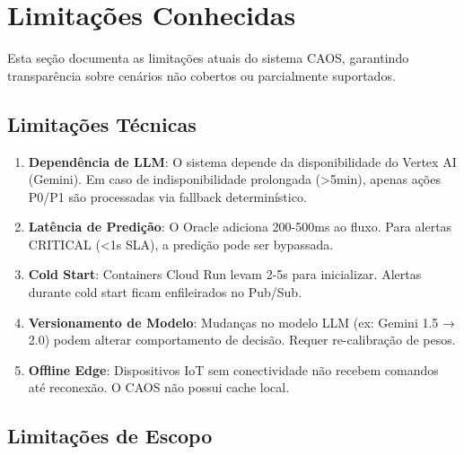 \documentclass[12pt, a4paper]{article}
\begin{document}
\newpage

\section{Limitações Conhecidas}
\label{sec:limitations}

Esta seção documenta as limitações atuais do sistema CAOS, garantindo transparência sobre cenários não cobertos ou parcialmente suportados.

\subsection{Limitações Técnicas}

\begin{enumerate}
    \item \textbf{Dependência de LLM}: O sistema depende da disponibilidade do Vertex AI (Gemini). Em caso de indisponibilidade prolongada (>5min), apenas ações P0/P1 são processadas via fallback determinístico.
    
    \item \textbf{Latência de Predição}: O Oracle adiciona 200-500ms ao fluxo. Para alertas CRITICAL (<1s SLA), a predição pode ser bypassada.
    
    \item \textbf{Cold Start}: Containers Cloud Run levam 2-5s para inicializar. Alertas durante cold start ficam enfileirados no Pub/Sub.
    
    \item \textbf{Versionamento de Modelo}: Mudanças no modelo LLM (ex: Gemini 1.5 → 2.0) podem alterar comportamento de decisão. Requer re-calibração de pesos.
    
    \item \textbf{Offline Edge}: Dispositivos IoT sem conectividade não recebem comandos até reconexão. O CAOS não possui cache local.
\end{enumerate}

\subsection{Limitações de Escopo}
\end{document}
